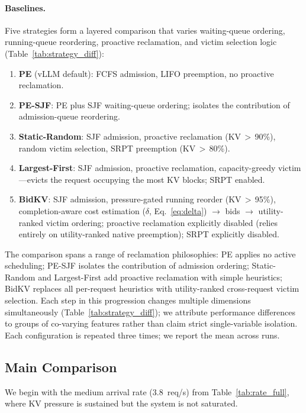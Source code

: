 \documentclass[sigconf,nonacm]{acmart}
\newcommand{\bidkv}{BidKV\xspace}
\newcommand{\qualdelta}{\ensuremath{\delta}}
\begin{document}
\paragraph{Baselines.}
Five strategies form a layered comparison that varies waiting-queue ordering,
running-queue reordering, proactive reclamation, and victim selection logic
(Table~\ref{tab:strategy_diff}):
\begin{enumerate}[nosep]
\item \textbf{PE} (vLLM default): FCFS admission, LIFO preemption, no
  proactive reclamation.
\item \textbf{PE-SJF}: PE plus SJF waiting-queue ordering; isolates the
  contribution of admission-queue reordering.
\item \textbf{Static-Random}: SJF admission, proactive reclamation
  (KV\,$>$\,90\%), random victim selection, SRPT preemption
  (KV\,$>$\,80\%).
\item \textbf{Largest-First}: SJF admission, proactive reclamation,
  capacity-greedy victim---evicts the request occupying the most KV blocks;
  SRPT enabled.
\item \textbf{\bidkv}: SJF admission, pressure-gated running reorder
  (KV\,$>$\,95\%), completion-aware cost estimation
  ($\qualdelta$, Eq.~\ref{eq:delta}) $\to$ bids $\to$ utility-ranked
  victim ordering; proactive reclamation explicitly disabled
  (relies entirely on utility-ranked native preemption);
  SRPT explicitly disabled.
\end{enumerate}

\noindent
The comparison spans a range of reclamation philosophies: PE applies no
active scheduling; PE-SJF isolates the contribution of admission ordering;
Static-Random and Largest-First add proactive reclamation with simple
heuristics; \bidkv replaces all per-request heuristics with utility-ranked
cross-request victim selection.  Each step in this progression changes multiple
dimensions simultaneously (Table~\ref{tab:strategy_diff}); we attribute
performance differences to groups of co-varying features rather than claim
strict single-variable isolation.  Each configuration is repeated three
times; we report the mean across runs.

\subsection{Main Comparison}\label{sec:eval:main}

We begin with the medium arrival rate (3.8~req/s) from
Table~\ref{tab:rate_full}, where KV pressure is sustained but the system is
not saturated.
\end{document}
